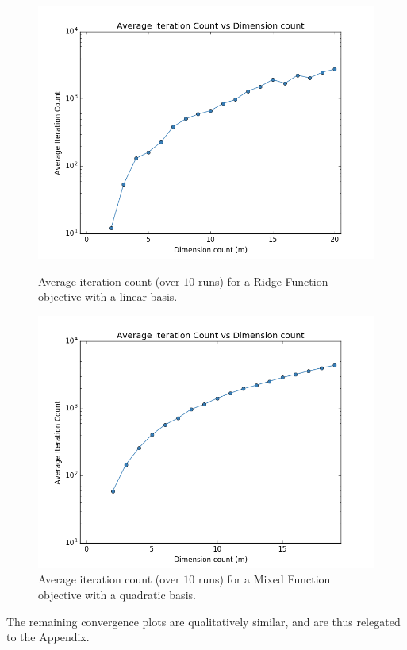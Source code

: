 \documentclass[]{aiaa-tc}%
\begin{document}
\begin{figure}[!ht]
\centering
\begin{minipage}{.50\textwidth}
 \centering
 \includegraphics[width=.8\textwidth]{../images/count_linear_basis_ridge_objective}
 \caption{Average iteration count (over $10$ runs) for a Ridge Function objective with a linear basis.}
 \label{fig:count_linear_basis_ridge_objective}
\end{minipage}%
\begin{minipage}{.50\textwidth}
 \centering
 \includegraphics[width=.8\textwidth]{../images/count_quadratic_basis_mixed_objective}
 \caption{Average iteration count (over $10$ runs) for a Mixed Function objective with a quadratic basis.}
 \label{fig:count_quadratic_basis_mixed_objective}
\end{minipage}
\end{figure}

\newpage
The remaining convergence plots are qualitatively similar, and are thus relegated to the Appendix.

\end{document}
